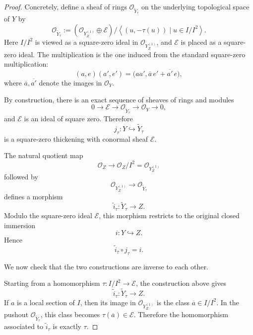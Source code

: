 \documentclass[11pt,twoside]{amsart}
\theoremstyle{plain}
\numberwithin{equation}{section}
\theoremstyle{definition}
\begin{document}
\begin{proof}
Concretely, define a sheaf of rings \(\mathcal O_{\widetilde Y_\tau}\) on the underlying
topological space of \(Y\) by
\[
    \mathcal O_{\widetilde Y_\tau}
    :=
    \left(
        \mathcal O_{Y^{(1)}_Z}\oplus \mathcal E
    \right)
    \big/
    \left\langle
        (u,-\tau(u))\mid u\in I/I^2
    \right\rangle.
\]
Here \(I/I^2\) is viewed as a square-zero ideal in \(\mathcal O_{Y^{(1)}_Z}\), and
\(\mathcal E\) is placed as a square-zero ideal. The multiplication is the one induced
from the standard square-zero multiplication:
\[
    (a,e)(a',e')
    =
    \bigl(
        aa',
        \overline a\, e'
        +
        \overline{a'}\, e
    \bigr),
\]
where \(\overline a,\overline{a'}\) denote the images in \(\mathcal O_Y\).

By construction, there is an exact sequence of sheaves of rings and modules
\[
    0\longrightarrow \mathcal E
    \longrightarrow \mathcal O_{\widetilde Y_\tau}
    \longrightarrow \mathcal O_Y
    \longrightarrow 0,
\]
and \(\mathcal E\) is an ideal of square zero. Therefore
\[
    j_\tau:Y\hookrightarrow \widetilde Y_\tau
\]
is a square-zero thickening with conormal sheaf \(\mathcal E\).

The natural quotient map
\[
    \mathcal O_Z
    \longrightarrow
    \mathcal O_Z/I^2
    =
    \mathcal O_{Y^{(1)}_Z}
\]
followed by
\[
    \mathcal O_{Y^{(1)}_Z}\to \mathcal O_{\widetilde Y_\tau}
\]
defines a morphism
\[
    \widetilde i_\tau:\widetilde Y_\tau\to Z.
\]
Modulo the square-zero ideal \(\mathcal E\), this morphism restricts to the original
closed immersion
\[
    i:Y\hookrightarrow Z.
\]
Hence
\[
    \widetilde i_\tau\circ j_\tau=i.
\]

We now check that the two constructions are inverse to each other.

Starting from a homomorphism \(\tau:I/I^2\to\mathcal E\), the construction above gives
\[
    \widetilde i_\tau:\widetilde Y_\tau\to Z.
\]
If \(a\) is a local section of \(I\), then its image in
\(\mathcal O_{Y^{(1)}_Z}\) is the class \(\overline a\in I/I^2\). In the pushout
\(\mathcal O_{\widetilde Y_\tau}\), this class becomes \(\tau(\overline a)\in\mathcal E\).
Therefore the homomorphism associated to \(\widetilde i_\tau\) is exactly \(\tau\).


\end{proof}
\end{document}
